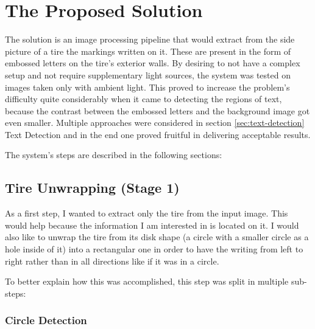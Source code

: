 \chapter{The Proposed Solution}\pagestyle{fancy}\setlength{\parindent}{3em}
\label{chap:proposed-solution}

The solution is an image processing pipeline that would extract from the side picture of a tire the markings written on it. These are present in the form of embossed letters on the tire's exterior walls. By desiring to not have a complex setup and not require supplementary light sources, the system was tested on images taken only with ambient light. This proved to increase the problem's difficulty quite considerably when it came to detecting the regions of text, because the contrast between the embossed letters and the background image got even smaller. Multiple approaches were considered in section \ref{sec:text-detection} Text Detection and in the end one proved fruitful in delivering acceptable results.

The system's steps are described in the following sections:

\section{Tire Unwrapping (Stage 1)}\label{sec:tire-unwrapping}

As a first step, I wanted to extract only the tire from the input image. This would help because the information I am interested in is located on it. I would also like to unwrap the tire from its disk shape (a circle with a smaller circle as a hole inside of it) into a rectangular one in order to have the writing from left to right rather than in all directions like if it was in a circle.

To better explain how this was accomplished, this step was split in multiple sub-steps:

\subsection{Circle Detection}

